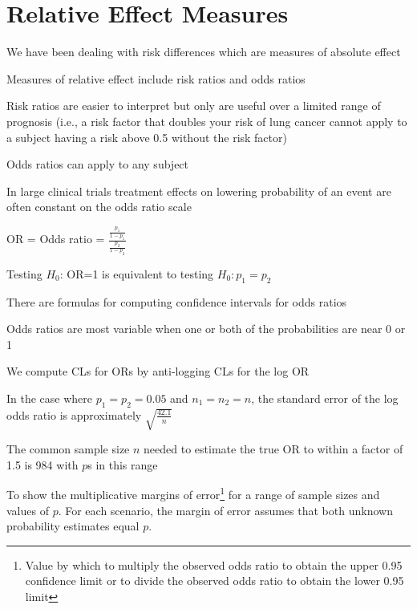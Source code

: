 \section{Relative Effect Measures}\label{sec:prop-rem}
\bi
\item We have been dealing with risk differences which are measures of
  absolute effect
\item Measures of relative effect include risk ratios and odds ratios
\item Risk ratios are easier to interpret but only are useful over a
  limited range of prognosis (i.e., a risk factor that doubles your
  risk of lung cancer cannot apply to a subject having a risk above
  0.5 without the risk factor)
\item Odds ratios can apply to any subject
\item In large clinical trials treatment effects on lowering
  probability of an event are often constant on the odds ratio scale
\item OR = Odds ratio =
  $\frac{\frac{p_{1}}{1-p_{1}}}{\frac{p_{2}}{1-p_{2}}}$
\item Testing $H_{0}$: OR=1 is equivalent to testing
  $H_{0}:p_{1}=p_{2}$
\item There are formulas for computing confidence intervals for odds
  ratios
\item Odds ratios are most variable when one or both of the
  probabilities are near 0 or 1
\item We compute CLs for ORs by anti-logging CLs for the log OR
\item In the case where $p_{1}=p_{2}=0.05$ and $n_{1}=n_{2}=n$, the
  standard error of the log odds ratio is approximately
  $\sqrt{\frac{42.1}{n}}$
\item The common sample size $n$ needed to estimate the true OR to
  within a factor of 1.5 is 984 with $p$s in this range
\item To show the multiplicative margins of error\footnote{Value by
    which to multiply the observed odds ratio to obtain the upper 0.95
    confidence limit or to divide the observed odds ratio to obtain
    the lower 0.95 limit} for a range of sample sizes and values of
  $p$.  For each scenario, the margin of error assumes that both
  unknown probability estimates equal $p$.
\ei

